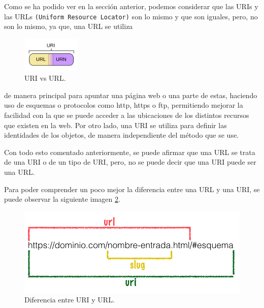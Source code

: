 \documentclass[11pt]{report}
\begin{document}
Como se ha podido ver en la sección anterior, podemos considerar que las URIs y las URLs \texttt{(Uniform Resource Locator)} son lo mismo y que son iguales, pero, no son lo mismo, ya que, una URL se utiliza 
\begin{figure}
	
	\includegraphics[width=0.25\textwidth]{../img/uri.png}
	\caption{URI vs URL.}
	\label{fig:Uri}
\end{figure}
de manera principal para apuntar una página web o una parte de estas, haciendo uso de esquemas o protocolos como http, https o ftp, permitiendo mejorar la facilidad con la que se puede acceder a las ubicaciones de los distintos recursos que existen en la web. Por otro lado, una URI se utiliza para definir las identidades de los objetos, de manera independiente del método que se use. 

Con todo esto comentado anteriormente, se puede afirmar que una URL se trata de una URI o de un tipo de URI, pero, no se puede decir que una URI puede ser una URL.

Para poder comprender un poco mejor la diferencia entre una URL y una URI, se puede observar la siguiente imagen \ref{fig:URI-URL}.

\begin{figure}[H]
	\centering
	\includegraphics[scale=0.6]{../img/diferencia-entre-url-y-uri.png}
	\caption{Diferencia entre URI y URL.}
	\label{fig:URI-URL}
\end{figure}

\end{document}
